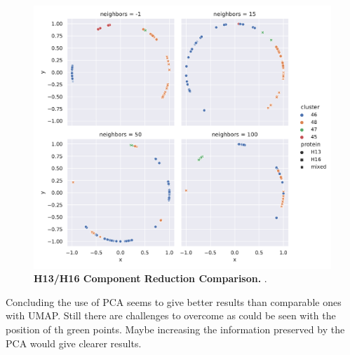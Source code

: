 \begin{figure}[hbt]
    \centering
    \includegraphics[width=\textwidth]{PCA/Difference_Segment_4_H_metric_cosine.pdf}
    \caption[H13/H16 Component Reduction Comparison]{\textbf{H13/H16 Component Reduction Comparison.} .}
    \label{fig:Reduction_Comparison}
\end{figure}

Concluding the use of \gls{PCA} seems to give better results than comparable ones with \gls{UMAP}. Still there are challenges to overcome as could be seen with the position of th green points. Maybe increasing the information preserved by the \gls{PCA} would give clearer results. 

